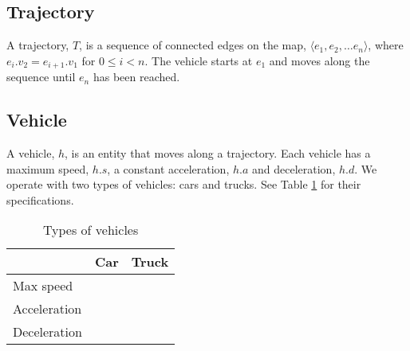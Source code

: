 \subsection{Trajectory}
A trajectory, $T$, is a sequence of connected edges on the map, $\langle e_1, e_2, \dots e_n \rangle$, where $e_i.v_2 = e_{i+1}.v_1$ for $0\leq i< n$.
The vehicle starts at $e_1$ and moves along the sequence until $e_n$ has been reached.

\begin{comment}
A trajectory is a sequence of connected edges on the map, on which a vehicle can move. The vehicle starts at the first edge and moves along the sequence until the end of the sequence has been reached.
Let 
\[
\mathcal{T}_E = \{(e_1, e_2, \dots, e_n)\mid e_i \in E\}
\]
and be the set of all trajectories and $t\in \mathcal{T}$ be one such trajectory.
\end{comment}

\subsection{Vehicle}
A vehicle, $h$, is an entity that moves along a trajectory.
Each vehicle has a maximum speed, $h.s$, a constant acceleration, $h.a$ and deceleration, $h.d$.
We operate with two types of vehicles: cars and trucks. See Table \ref{table.vehicleTypes} for their specifications.
\begin{table}
\centering
\begin{tabular}{|l|l|l|}\hline
				& Car	& Truck \\\hline
Max speed 		& 		& \\\hline
Acceleration 	&		& \\\hline
Deceleration 	&		& \\\hline
\end{tabular}
\caption{Types of vehicles}\label{table.vehicleTypes}
\end{table}

\begin{comment}
A vehicle is an entity that moves along a trajectory. Each vehicle has a maximum speed and a constant acceleration and deceleration.
Let
\[
\mathcal{H} = \{(s, a, d)\mid s, a, d\in \mathbb{N}\}
\]
and be the set of all vehicles and $h\in \mathcal{H}$ be one such vehicle.
\end{comment}

